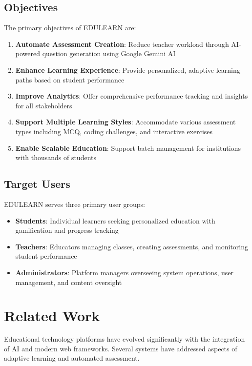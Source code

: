 \documentclass[conference]{IEEEtran}
\begin{document}
\subsection{Objectives}
The primary objectives of EDULEARN are:
\begin{enumerate}
    \item \textbf{Automate Assessment Creation}: Reduce teacher workload through AI-powered question generation using Google Gemini AI
    \item \textbf{Enhance Learning Experience}: Provide personalized, adaptive learning paths based on student performance
    \item \textbf{Improve Analytics}: Offer comprehensive performance tracking and insights for all stakeholders
    \item \textbf{Support Multiple Learning Styles}: Accommodate various assessment types including MCQ, coding challenges, and interactive exercises
    \item \textbf{Enable Scalable Education}: Support batch management for institutions with thousands of students
\end{enumerate}

\subsection{Target Users}
EDULEARN serves three primary user groups:
\begin{itemize}
    \item \textbf{Students}: Individual learners seeking personalized education with gamification and progress tracking
    \item \textbf{Teachers}: Educators managing classes, creating assessments, and monitoring student performance
    \item \textbf{Administrators}: Platform managers overseeing system operations, user management, and content oversight
\end{itemize}

\section{Related Work}

Educational technology platforms have evolved significantly with the integration of AI and modern web frameworks. Several systems have addressed aspects of adaptive learning and automated assessment.
\end{document}
